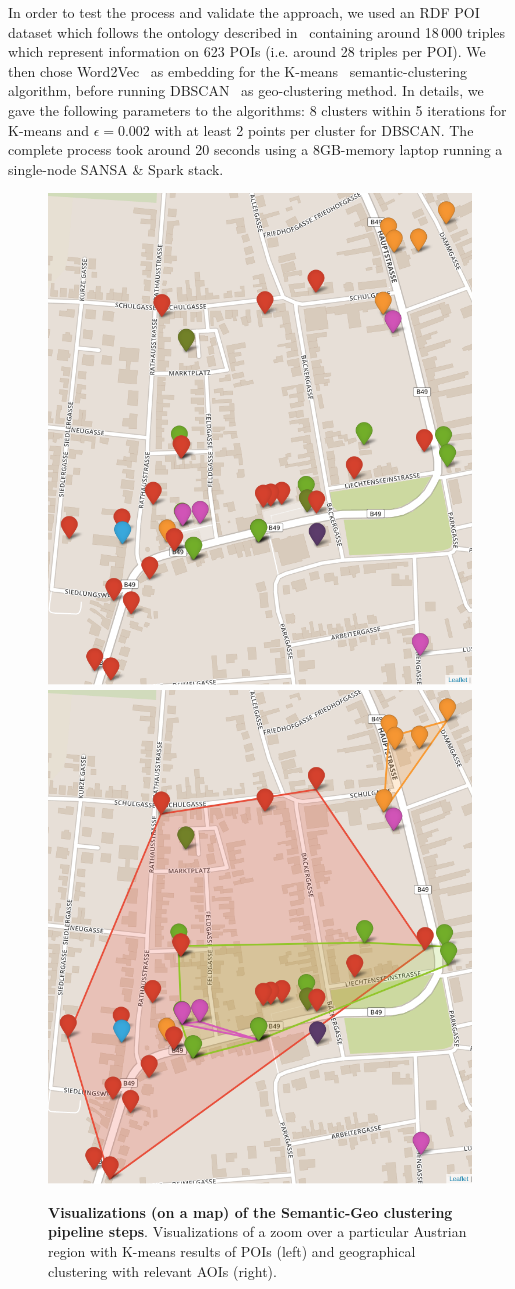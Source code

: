 In order to test the process and validate the approach, we used an \gls{RDF} \gls{POI} dataset which follows the ontology described in~\cite{Athanasiou2019BigPD} containing around 18\,000 triples which represent information on 623 \gls{POI}s (i.e. around 28 triples per \gls{POI}). We then chose Word2Vec~\cite{mikolov2013distributed} as embedding for the K-means~\cite{kmeans-algo} semantic-clustering algorithm, before running DBSCAN~\cite{ester1996density} as geo-clustering method. In details, we gave the following parameters to the algorithms: 8 clusters within 5 iterations for K-means and $\epsilon=0.002$ with at least 2 points per cluster for DBSCAN.
The complete process took around 20 seconds using a 8GB-memory laptop running a single-node SANSA \& Spark stack.

\begin{figure}
    \centering
    \includegraphics[width=.49\textwidth]{images/7_implemenation_and_usecases/kmean.png}
	\includegraphics[width=.49\textwidth]{images/7_implemenation_and_usecases/kmeandbscan.png}
    \caption{\textbf{Visualizations (on a map) of the Semantic-Geo clustering pipeline steps}.
    Visualizations of a zoom over a particular Austrian region with K-means results of POIs (left) and geographical clustering with relevant AOIs (right).}
    \label{fig:imp-use-cases-map}
\end{figure}


